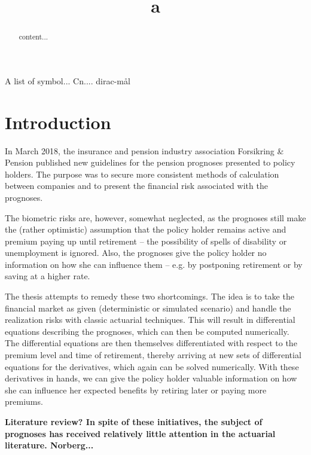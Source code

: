 \documentclass{article}
\title{a} %
\newcommand{\1}[1]{\mathbbm{1}_{\left\lbrace #1 \right\rbrace}}
\theoremstyle{break}
\theoremstyle{remark}
\numberwithin{equation}{section}
\begin{document}
\maketitle

\begin{abstract}
	content...
\end{abstract}

\newpage

\tableofcontents

\newpage

A list of symbol... Cn.... dirac-mål

\section{Introduction}

In March 2018, the insurance and pension industry association Forsikring \& Pension published new guidelines for the pension prognoses presented to policy holders. The purpose was to secure more consistent methods of calculation between companies and to present the financial risk associated with the prognoses.

The biometric risks are, however, somewhat neglected, as the prognoses still make the (rather optimistic) assumption that the policy holder remains active and premium paying up until retirement -- the possibility of spells of disability or unemployment is ignored. Also, the prognoses give the policy holder no information on how she can influence them -- e.g. by postponing retirement or by saving at a higher rate.

The thesis attempts to remedy these two shortcomings. The idea is to take the financial market as given (deterministic or simulated scenario) and handle the realization risks with classic actuarial techniques. This will result in differential equations describing the prognoses, which can then be computed numerically. The differential equations are then themselves differentiated with respect to the premium level and time of retirement, thereby arriving at new sets of differential equations for the derivatives, which again can be solved numerically. With these derivatives in hands, we can give the policy holder valuable information on how she can influence her expected benefits by retiring later or paying more premiums.

\textbf{Literature review? In spite of these initiatives, the subject of prognoses has received relatively little attention in the actuarial literature. Norberg...}
\end{document}

